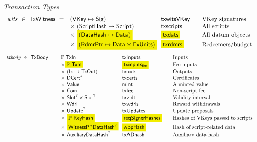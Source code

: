 \begin{figure*}[htb]
  \emph{Transaction Types}
  \begin{equation*}
    \begin{array}{r@{~~}l@{~~}l@{\qquad}l}
      \var{wits} ~\in~ \TxWitness ~=~
       & (\VKey \mapsto \Sig) & \fun{txwitsVKey} & \text{VKey signatures}\\
       & \times ~(\ScriptHash \mapsto \Script)  & \fun{txscripts} & \text{All scripts}\\
       & \times~ \hldiff{(\DataHash \mapsto \Data)} & \hldiff{\fun{txdats}} & \text{All datum objects}\\
       & \times ~\hldiff{(\RdmrPtr \mapsto \Data \times \ExUnits)}& \hldiff{\fun{txrdmrs}}& \text{Redeemers/budget}\\
    \end{array}
  \end{equation*}
  \begin{equation*}
    \begin{array}{r@{~~}l@{~~}l@{\qquad}l}
      \var{txbody} ~\in~ \TxBody ~=~
      & \powerset{\TxIn} & \fun{txinputs}& \text{Inputs}\\
      & \times \hldiff{\powerset{\TxIn}} & \hldiff{\fun{txinputs_{fee}}}& \text{Fee inputs}\\
      &\times ~(\Ix \mapsto \TxOut) & \fun{txouts}& \text{Outputs}\\
      & \times~ \seqof{\DCert} & \fun{txcerts}& \text{Certificates}\\
       & \times ~\Value  & \fun{mint} &\text{A minted value}\\
       & \times ~\Coin & \fun{txfee} &\text{Non-script fee}\\
       & \times ~\Slot^? \times \Slot^? & \fun{txvldt} & \text{Validity interval}\\
       & \times~ \Wdrl  & \fun{txwdrls} &\text{Reward withdrawals}\\
       & \times ~\Update^?  & \fun{txUpdates} & \text{Update proposals}\\
       & \times ~\hldiff{\powerset{\KeyHash}} & \hldiff{\fun{reqSignerHashes}} & \text{Hashes of VKeys passed to scripts}\\
       & \times ~\hldiff{\WitnessPPDataHash^?} & \hldiff{\fun{wppHash}} & \text{Hash of script-related data}\\
       & \times ~\AuxiliaryDataHash^? & \fun{txADhash} & \text{Auxiliary data hash}\\
    \end{array}

\end{equation*}
\end{figure*}
